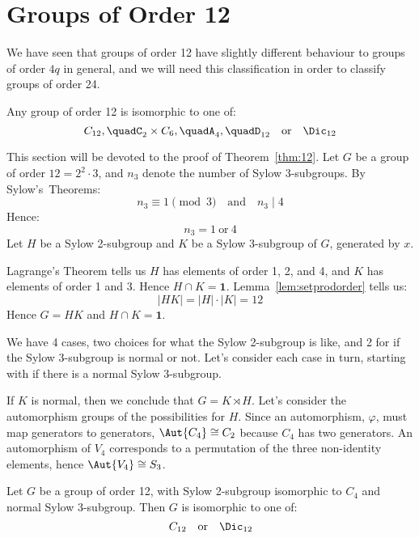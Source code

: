 \section{Groups of Order 12}
We have seen that groups of order 12 have slightly different behaviour to groups of order \(4q\) in general, and we will
need this classification in order to classify groups of order 24.

\begin{theorem}\label{thm:12}
    Any group of order 12 is isomorphic to one of:
    \[
        C_{12}, \quad%
        C_2 \times C_6, \quad%
        A_4, \quad%
        D_{12} \quad \text{or} \quad%
        \Dic_{12}
    \]
\end{theorem}

This section will be devoted to the proof of Theorem~\ref{thm:12}.
Let \(G\) be a group of order \(12 = 2^2 \cdot 3\), and \(n_3\) denote the number of Sylow 3-subgroups.
By Sylow's~Theorems:
\[n_3 \equiv 1 \pmod{3} \quad \text{and} \quad n_3 \mid 4\]
Hence:
\[n_3 = 1 \ \text{or} \ 4\]
Let \(H\) be a Sylow 2-subgroup and \(K\) be a Sylow 3-subgroup of \(G\), generated by \(x\).

Lagrange's Theorem tells us \(H\) has elements of order 1, 2, and 4, and \(K\) has elements of order 1 and 3.
Hence \(H \cap K = \bm{1}\).
Lemma~\ref{lem:setprodorder} tells us:
\[|HK| = |H| \cdot |K| = 12\]
Hence \(G = HK\) and \(H \cap K = \bm{1}\).

We have 4 cases, two choices for what the Sylow 2-subgroup is like, and 2 for if the Sylow 3-subgroup is normal or not.
Let's consider each case in turn, starting with if there is a normal Sylow 3-subgroup.

If \(K\) is normal, then we conclude that \(G = K \rtimes H\).
Let's consider the automorphism groups of the possibilities for \(H\).
Since an automorphism, \(\varphi\), must map generators to generators, \(\Aut{C_4} \cong C_2\) because \(C_4\) has two
generators.
An automorphism of \(V_4\) corresponds to a permutation of the three
non-identity elements, hence \(\Aut{V_4} \cong S_3\).


\begin{lemma}
    Let \(G\) be a group of order 12, with Sylow 2-subgroup isomorphic to \(C_4\) and normal Sylow 3-subgroup.
    Then \(G\) is isomorphic to one of:
    \[
        C_{12} \quad \text{or} \quad%
        \Dic_{12}
    \]
\end{lemma}

